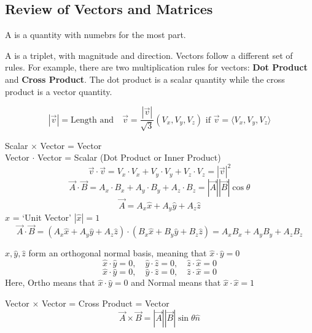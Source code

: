 \documentclass[11pt]{article}
\begin{document}
\subsection{Review of Vectors and Matrices}
\begin{definition}
    A  is a quantity with numebrs for the most part.
\end{definition}

\begin{definition}
    A  is a triplet, with magnitude and direction. Vectors follow a different set of rules. For example, there are two multiplication rules for vectors: \textbf{Dot Product} and \textbf{Cross Product}. The dot product is a scalar quantity while the cross product is a vector quantity.

    \[
        |\vec{v}| = \text{Length and} \quad \vec{v} = \frac{|\vec{v}|}{\sqrt{3}}(V_x, V_y, V_z) \text{ if } \vec{v} = \langle V_x, V_y, V_z \rangle
    \]

    Scalar \(\times\) Vector = Vector \\ Vector \(\cdot\) Vector = Scalar (Dot
    Product or Inner Product) \\
    \[
        \vec{v} \cdot \vec{v} = V_x \cdot V_x + V_y \cdot V_y + V_z \cdot V_z = |\vec{v}|^2
    \]
    \[
        \vec{A} \cdot \vec{B} = A_x \cdot B_x + A_y \cdot B_y + A_z \cdot B_z = |\vec{A}| |\vec{B}| \cos \theta
    \]
    \[
        \vec{A} = A_x \hat{x} + A_y \hat{y} + A_z \hat{z} \]
    \(\hat{x}\) = `Unit Vector'
    \(|\hat{x}| = 1\)
    \[\vec{A} \cdot \vec{B} = (A_x \hat{x} + A_y \hat{y} + A_z \hat{z}) \cdot (B_x \hat{x} + B_y \hat{y} + B_z \hat{z}) = A_x B_x + A_y B_y + A_z B_z\]

    \(\hat{x}, \hat{y}, \hat{z}\) form an orthogonal normal basis, meaning that \(\hat{x} \cdot \hat{y} = 0\)
    \[\hat{x} \cdot \hat{y} = 0, \quad \hat{y} \cdot \hat{z} = 0, \quad \hat{z} \cdot \hat{x} = 0\]
    \[
        \hat{x} \cdot \hat{y} = 0, \quad \hat{y} \cdot \hat{z} = 0, \quad \hat{z} \cdot \hat{x} = 0
    \]
    Here, Ortho means that \(\hat{x} \cdot \hat{y} = 0\) and Normal means that
    \(\hat{x} \cdot \hat{x} = 1\)

\end{definition}

Vector \(\times\) Vector = Cross Product = Vector
\[
    \vec{A} \times \vec{B} = |\vec{A}| |\vec{B}| \sin \theta \hat{n}
\]
\end{document}
